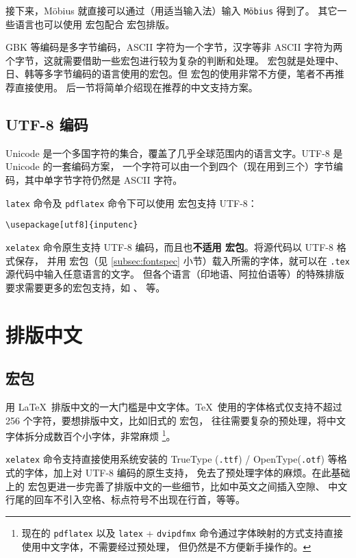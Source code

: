 接下来，M\"obius 就直接可以通过（用适当输入法）输入 \texttt{M\"obius} 得到了。
其它一些语言也可以使用  宏包配合  宏包排版。

GBK 等编码是多字节编码，ASCII 字符为一个字节，汉字等非 ASCII 字符为两个字节，这就需要借助一些宏包进行较为复杂的判断和处理。
 宏包就是处理中、日、韩等多字节编码的语言使用的宏包。但  宏包的使用非常不方便，笔者不再推荐直接使用。
后一节将简单介绍现在推荐的中文支持方案。

\subsection{UTF-8 编码}\label{subsec:utf8}

Unicode 是一个多国字符的集合，覆盖了几乎全球范围内的语言文字。UTF-8 是 Unicode 的一套编码方案，
一个字符可以由一个到四个（现在用到三个）字节编码，其中单字节字符仍然是 ASCII 字符。

\texttt{latex} 命令及 \texttt{pdflatex} 命令下可以使用  宏包支持 UTF-8：
\begin{verbatim}
\usepackage[utf8]{inputenc}
\end{verbatim}

\texttt{xelatex} 命令原生支持 UTF-8 编码，而且也\textbf{不适用  宏包}。将源代码以 UTF-8 格式保存，
并用  宏包（见 \ref{subsec:fontspec} 小节）载入所需的字体，就可以在 \texttt{.tex} 源代码中输入任意语言的文字。
但各个语言（印地语、阿拉伯语等）的特殊排版要求需要更多的宏包支持，如 、  等。

\section{排版中文}\label{sec:chinese}

\subsection{ 宏包}\label{subsec:xeCJK}

用 \LaTeX\ 排版中文的一大门槛是中文字体。\TeX\ 使用的字体格式仅支持不超过 256 个字符，要想排版中文，比如旧式的  宏包，
往往需要复杂的预处理，将中文字体拆分成数百个小字体，非常麻烦%
\footnote{现在的 \texttt{pdflatex} 以及 \texttt{latex} + \texttt{dvipdfmx} 命令通过字体映射的方式支持直接使用中文字体，不需要经过预处理，
但仍然是不方便新手操作的。}。

\texttt{xelatex} 命令支持直接使用系统安装的 TrueType (\texttt{.ttf}) / OpenType(\texttt{.otf}) 等格式的字体，加上对 UTF-8 编码的原生支持，
免去了预处理字体的麻烦。在此基础上的  宏包更进一步完善了排版中文的一些细节，比如中英文之间插入空隙、
中文行尾的回车不引入空格、标点符号不出现在行首，等等。

